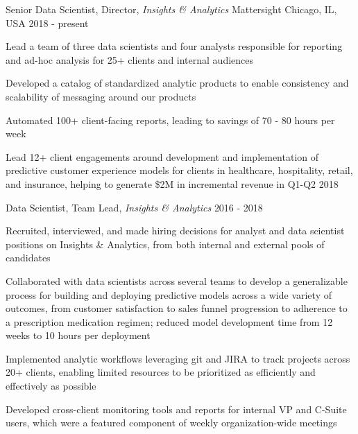 
\begin{cventries}

 \cventry
    {Senior Data Scientist, Director, \textit{Insights \& Analytics}} %
    {Mattersight} %
    {Chicago, IL, USA} %
    {2018 - present} %
    {
      \begin{cvitems}
        \item {Lead a team of three data scientists and four analysts responsible for reporting and ad-hoc analysis for 25+ clients and internal audiences}
        \item {Developed a catalog of standardized analytic products to enable consistency and scalability of messaging around our products}
        \item {Automated 100+ client-facing reports, leading to savings of 70 - 80 hours per week}
        \item {Lead 12+ client engagements around development and implementation of predictive customer experience models for clients in healthcare, hospitality, retail, and insurance, helping to generate \$2M in incremental revenue in Q1-Q2 2018}
      \end{cvitems}
      }

  \cventry
    {Data Scientist, Team Lead, \textit{Insights \& Analytics}} %
    {} %
    {} %
    {2016 - 2018} %
    {
      \begin{cvitems}
        \item {Recruited, interviewed, and made hiring decisions for analyst and data scientist positions on Insights \& Analytics, from both internal and external pools of candidates}
        \item {Collaborated with data scientists across several teams to develop a generalizable process for building and deploying predictive models across a wide variety of outcomes, from customer satisfaction to sales funnel progression to adherence to a prescription medication regimen; reduced model development time from 12 weeks to 10 hours per deployment}
        \item {Implemented analytic workflows leveraging git and JIRA to track projects across 20+ clients, enabling limited resources to be prioritized as efficiently and effectively as possible}
        \item{Developed cross-client monitoring tools and reports for internal VP and C-Suite users, which were a featured component of weekly organization-wide meetings}
      \end{cvitems}
    }


\end{cventries}
